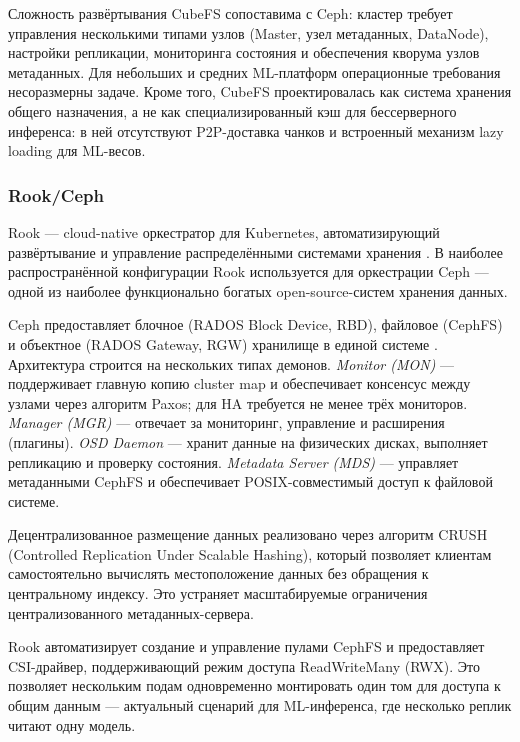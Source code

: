  Сложность развёртывания CubeFS сопоставима с Ceph: кластер требует управления несколькими типами узлов (Master, узел метаданных, DataNode), настройки репликации, мониторинга состояния и обеспечения кворума узлов метаданных. Для небольших и средних ML-платформ операционные требования несоразмерны задаче. Кроме того, CubeFS проектировалась как система хранения общего назначения, а не как специализированный кэш для бессерверного инференса: в ней отсутствуют P2P-доставка чанков и встроенный механизм lazy loading для ML-весов.

\subsubsection{Rook/Ceph}

Rook --- cloud-native оркестратор для Kubernetes, автоматизирующий развёртывание и управление распределёнными системами хранения \cite{rook_docs}. В наиболее распространённой конфигурации Rook используется для оркестрации Ceph --- одной из наиболее функционально богатых open-source-систем хранения данных.

 Ceph предоставляет блочное (RADOS Block Device, RBD), файловое (CephFS) и объектное (RADOS Gateway, RGW) хранилище в единой системе \cite{ceph_arch}. Архитектура строится на нескольких типах демонов. \textit{Monitor (MON)} --- поддерживает главную копию cluster map и обеспечивает консенсус между узлами через алгоритм Paxos; для HA требуется не менее трёх мониторов. \textit{Manager (MGR)} --- отвечает за мониторинг, управление и расширения (плагины). \textit{OSD Daemon} --- хранит данные на физических дисках, выполняет репликацию и проверку состояния. \textit{Metadata Server (MDS)} --- управляет метаданными CephFS и обеспечивает POSIX-совместимый доступ к файловой системе.

Децентрализованное размещение данных реализовано через алгоритм CRUSH (Controlled Replication Under Scalable Hashing), который позволяет клиентам самостоятельно вычислять местоположение данных без обращения к центральному индексу. Это устраняет масштабируемые ограничения централизованного метаданных-сервера.

 Rook автоматизирует создание и управление пулами CephFS и предоставляет CSI-драйвер, поддерживающий режим доступа ReadWriteMany (RWX). Это позволяет нескольким подам одновременно монтировать один том для доступа к общим данным --- актуальный сценарий для ML-инференса, где несколько реплик читают одну модель.

